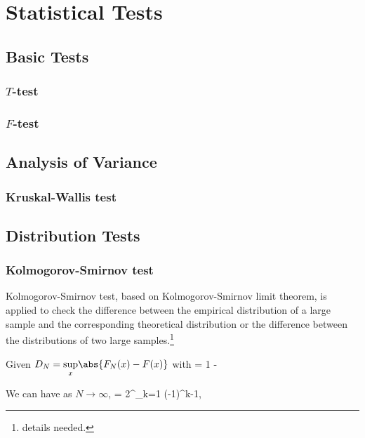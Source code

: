 \chapter{Statistical Tests}

\section{Basic Tests}

\subsection{$T$-test}

\subsection{$F$-test}

\section{Analysis of Variance}

\subsection{Kruskal-Wallis test}

\section{Distribution Tests}

\subsection{Kolmogorov-Smirnov test}

Kolmogorov-Smirnov test, based on Kolmogorov-Smirnov limit theorem, is applied to check the difference between the empirical distribution of a large sample and the corresponding theoretical distribution or the difference
between the distributions of two large samples.\footnote{details needed.}


Given $D_N = \underset{x}{\sup}\abs{F_N(x) - F(x)}$ with 
\be
\pro{} = 1 -\alpha
\ee

We can have as $N\to \infty$,
\be
\alpha = 2\sum^\infty_{k=1} (-1)^{k-1}\exp{},
\ee

